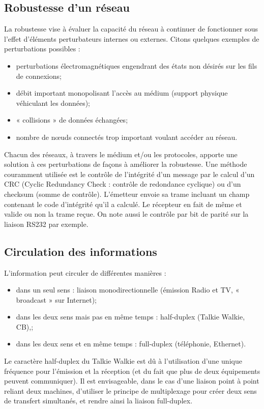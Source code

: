 \documentclass[10pt]{article}
\begin{document}
\subsection{Robustesse d'un réseau}

La robustesse vise à évaluer la capacité du réseau à continuer de fonctionner sous l’effet d’éléments perturbateurs internes ou externes.
Citons quelques exemples de perturbations possibles :
\begin{itemize}
\item perturbations électromagnétiques engendrant des états non désirés sur les fils de connexions;
\item débit important monopolisant l’accès au médium (support physique véhiculant les données);
\item « collisions » de données échangées;
\item nombre de nœuds connectés trop important voulant accéder au réseau.
\end{itemize}
Chacun des réseaux, à travers le médium et/ou les protocoles, apporte une solution à ces perturbations de façons à améliorer la robustesse.
Une méthode couramment utilisée est le contrôle de l’intégrité d’un message par le calcul d’un CRC (Cyclic Redundancy Check : contrôle de redondance cyclique) ou d’un checksum (somme de contrôle). L’émetteur envoie sa trame incluant un champ contenant le code d’intégrité qu’il a calculé. Le récepteur en fait de même et valide ou non la trame reçue. On note aussi le contrôle par bit de parité sur la liaison RS232 par exemple.


\subsection{Circulation des informations}

L’information peut circuler de différentes manières :
\begin{itemize}
\item dans un seul sens : liaison monodirectionnelle (émission Radio et TV, « broadcast » sur Internet);
\item dans les deux sens mais pas en même temps : half-duplex (Talkie Walkie, CB),;
\item dans les deux sens et en même temps : full-duplex (téléphonie, Ethernet).
\end{itemize}

Le caractère half-duplex du Talkie Walkie est dû à l’utilisation d’une unique fréquence pour l’émission et la réception (et du fait que plus de deux équipements peuvent communiquer). Il est envisageable, dans le cas d’une liaison point à point reliant deux machines, d’utiliser le principe de multiplexage pour créer deux sens de transfert simultanés, et rendre ainsi la liaison full-duplex.
\end{document}
